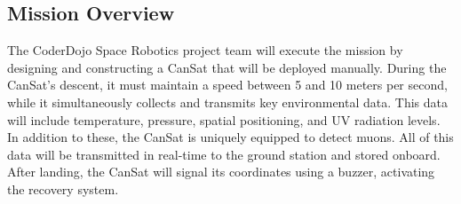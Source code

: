 \subsection{Mission Overview}

The CoderDojo Space Robotics project team will execute the mission by designing and constructing a CanSat that will be deployed manually. During the CanSat's descent, it must maintain a speed between 5 and 10 meters per second, while it simultaneously collects and transmits key environmental data. This data will include temperature, pressure, spatial positioning, and UV radiation levels. In addition to these, the CanSat is uniquely equipped to detect muons. All of this data will be transmitted in real-time to the ground station and stored onboard. After landing, the CanSat will signal its coordinates using a buzzer, activating the recovery system.

